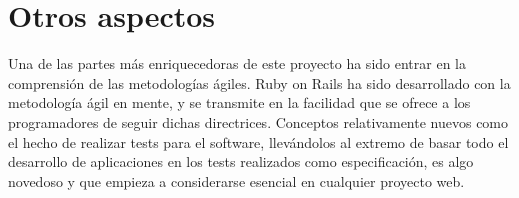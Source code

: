 \section{Otros aspectos} %
\label{sec:otros_aspectos}

Una de las partes más enriquecedoras de este proyecto ha sido entrar en la comprensión de las metodologías ágiles. Ruby on Rails ha sido desarrollado con la metodología ágil en mente, y se transmite en la facilidad que se ofrece a los programadores de seguir dichas directrices. Conceptos relativamente nuevos como el hecho de realizar tests para el software, llevándolos al extremo de basar todo el desarrollo de aplicaciones en los tests realizados como especificación, es algo novedoso y que empieza a considerarse esencial en cualquier proyecto web.



